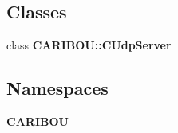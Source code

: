 \subsection*{Classes}
\begin{DoxyCompactItemize}
\item 
class {\bf C\+A\+R\+I\+B\+O\+U\+::\+C\+Udp\+Server}
\end{DoxyCompactItemize}
\subsection*{Namespaces}
\begin{DoxyCompactItemize}
\item 
 {\bf C\+A\+R\+I\+B\+OU}
\end{DoxyCompactItemize}
